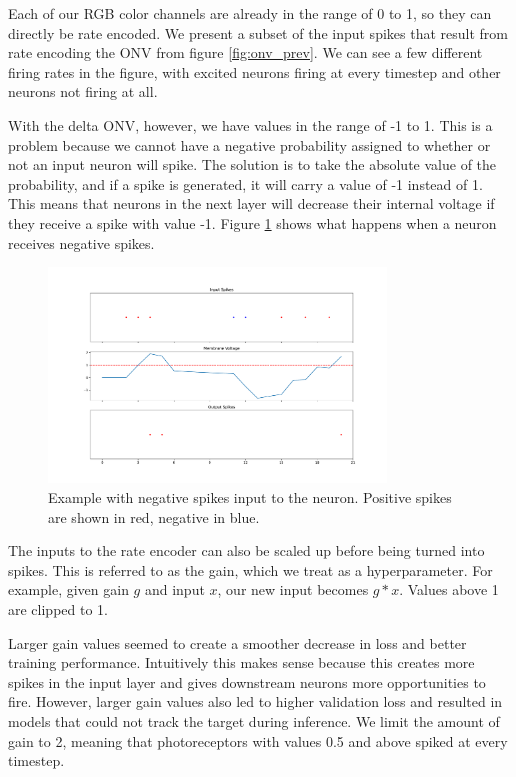 \documentclass[../taasin.tex]{subfiles}
\begin{document}
Each of our RGB color channels are already in the range of 0 to 1, so they can directly be rate encoded. We present a subset of the input spikes that result from rate encoding the ONV from figure \ref{fig:onv_prev}. We can see a few different firing rates in the figure, with excited neurons firing at every timestep and other neurons not firing at all.

With the delta ONV, however, we have values in the range of -1 to 1. This is a problem because we cannot have a negative probability assigned to whether or not an input neuron will spike. The solution is to take the absolute value of the probability, and if a spike is generated, it will carry a value of -1 instead of 1. This means that neurons in the next layer will decrease their internal voltage if they receive a spike with value -1. Figure \ref{fig:negative_spike_example} shows what happens when a neuron receives negative spikes.

\begin{figure}[h]
    \centering
    \includegraphics[width=0.8\textwidth]{figures/negative_spike_example.pdf}
    \caption{Example with negative spikes input to the neuron. Positive spikes are shown in red, negative in blue.}
    \label{fig:negative_spike_example}
\end{figure}

The inputs to the rate encoder can also be scaled up before being turned into spikes. This is referred to as the gain, which we treat as a hyperparameter. For example, given gain $g$ and input $x$, our new input becomes $g*x$. Values above 1 are clipped to 1.

Larger gain values seemed to create a smoother decrease in loss and better training performance. Intuitively this makes sense because this creates more spikes in the input layer and gives downstream neurons more opportunities to fire. However, larger gain values also led to higher validation loss and resulted in models that could not track the target during inference. We limit the amount of gain to 2, meaning that photoreceptors with values 0.5 and above spiked at every timestep.
\end{document}
